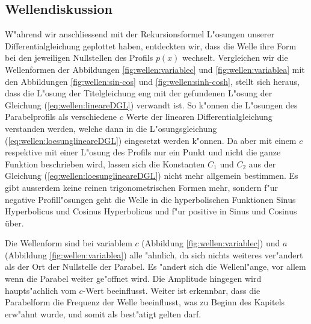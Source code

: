 \subsection{Wellendiskussion}
\label{sec:wellen:diskussionwellenform}
W"ahrend wir anschliessend mit der Rekursionsformel L"osungen unserer 
Differentialgleichung geplottet haben, entdeckten wir, dass die Welle ihre Form 
bei den jeweiligen Nullstellen des Profils $p(x)$ wechselt. Vergleichen wir die 
Wellenformen der Abbildungen \ref{fig:wellen:variablec} und 
\ref{fig:wellen:variablea} mit den Abbildungen \ref{fig:wellen:sin-cos} und 
\ref{fig:wellen:sinh-cosh}, stellt sich heraus, dass die L"osung der 
Titelgleichung eng mit der gefundenen L"osung der Gleichung 
(\ref{eq:wellen:lineareDGL}) verwandt ist. So k"onnen die L"osungen des 
Parabelprofils als verschiedene $c$ Werte der linearen Differentialgleichung 
verstanden werden, welche dann in die L"osungsgleichung 
(\ref{eq:wellen:loesunglineareDGL}) eingesetzt werden k"onnen. 
Da aber mit einem $c$ respektive mit einer L"osung des Profils nur ein Punkt 
und nicht die ganze Funktion beschrieben wird, lassen sich die Konstanten $C_1$ 
und $C_2$ aus der Gleichung (\ref{eq:wellen:loesunglineareDGL}) nicht mehr 
allgemein bestimmen. Es gibt ausserdem keine reinen trigonometrischen Formen 
mehr, sondern f"ur negative Profill"osungen geht die Welle in die 
hyperbolischen Funktionen Sinus Hyperbolicus und Cosinus Hyperbolicus und f"ur 
positive in Sinus und Cosinus über.

Die Wellenform sind bei variablem $c$ (Abbildung \ref{fig:wellen:variablec}) 
und $a$ (Abbildung \ref{fig:wellen:variablea}) alle "ahnlich, da sich nichts 
weiteres ver"andert als der Ort der Nullstelle der Parabel. Es "andert sich die 
Wellenl"ange, vor allem wenn die Parabel weiter ge"offnet wird. Die Amplitude 
hingegen wird haupts"achlich vom $c$-Wert beeinflusst. Weiter ist erkennbar, 
dass die Parabelform die Frequenz der Welle beeinflusst, was zu Beginn 
des Kapitels erw"ahnt wurde, und somit als best"atigt gelten darf.

